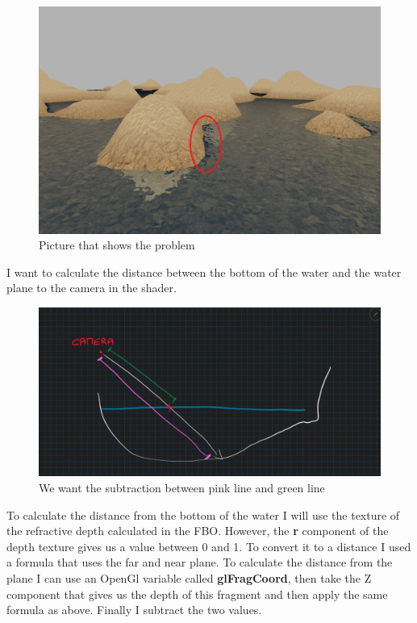 \begin{figure}[hbt!]
	\centering
	\includegraphics[width= 0.9
	\textwidth]{images/Water6.png}
	\caption{Picture that shows the problem}
\end{figure} 

\noindent
I want to calculate the distance between the bottom of the water and the water plane to the camera in the shader.

\begin{figure}[hbt!]
	\centering
	\includegraphics[width= 0.9
	\textwidth]{images/Water7.jpg}
	\caption{We want the subtraction between pink line and green line}
\end{figure} 

\noindent
To calculate the distance from the bottom of the water I will use the texture of the refractive depth calculated in the FBO. However, the \textbf{r} component of the depth texture gives us a value between 0 and 1. To convert it to a distance I used a formula that uses the far and near plane.
To calculate the distance from the plane I can use an OpenGl variable called \textbf{gl\textunderscore FragCoord}, then take the Z component that gives us the depth of this fragment and then apply the same formula as above. Finally I subtract the two values.

